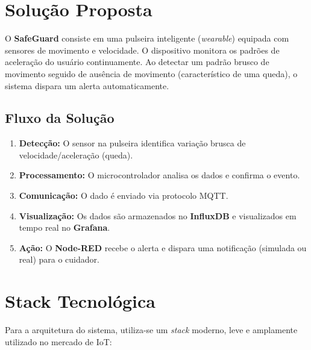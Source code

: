 \documentclass[a4paper,12pt]{article}
\begin{document}
\section{Solução Proposta}

O \textbf{SafeGuard} consiste em uma pulseira inteligente (\textit{wearable}) equipada com sensores de movimento e velocidade. O dispositivo monitora os padrões de aceleração do usuário continuamente. Ao detectar um padrão brusco de movimento seguido de ausência de movimento (característico de uma queda), o sistema dispara um alerta automaticamente.

\subsection{Fluxo da Solução}

\begin{enumerate}[leftmargin=2cm]
    \item \textbf{Detecção:} O sensor na pulseira identifica variação brusca de velocidade/aceleração (queda).
    \item \textbf{Processamento:} O microcontrolador analisa os dados e confirma o evento.
    \item \textbf{Comunicação:} O dado é enviado via protocolo MQTT.
    \item \textbf{Visualização:} Os dados são armazenados no \textbf{InfluxDB} e visualizados em tempo real no \textbf{Grafana}.
    \item \textbf{Ação:} O \textbf{Node-RED} recebe o alerta e dispara uma notificação (simulada ou real) para o cuidador.
\end{enumerate}

\section{Stack Tecnológica}

Para a arquitetura do sistema, utiliza-se um \textit{stack} moderno, leve e amplamente utilizado no mercado de IoT:
\end{document}
